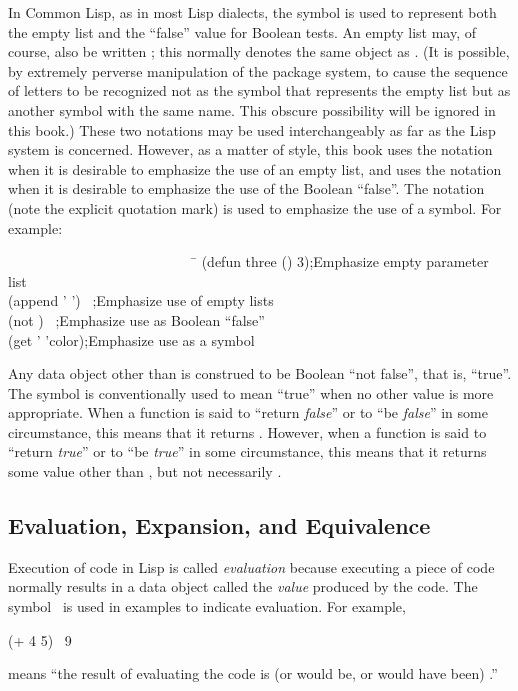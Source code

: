 In Common Lisp, as in most Lisp dialects, the symbol 
is used to represent both the empty list and the ``false'' value
for Boolean tests.  An empty list may, of course, also be written
\cd{()}; this normally denotes the same object as .
(It is possible, by extremely perverse manipulation of the package system,
to cause the sequence of letters  to be recognized
not as the symbol that represents the empty list but as another
symbol with the same name.  This obscure possibility will be ignored
in this book.)
These two notations may be used interchangeably as far as the Lisp
system is concerned.  However, as a matter of style,
this book
uses the notation {\empty} when it is desirable to emphasize
the use of an empty list, and uses the notation {\false}
when it is desirable to emphasize the use of the Boolean ``false''.
The notation  (note the explicit quotation mark) is used to emphasize
the use of a symbol.
For example:
\begin{lisp}
~~~~~~~~~~~~~~~~~~~~~~~~~~~\=\kill
(defun three () 3)\>;{\rm Emphasize empty parameter list} \\
(append '{\empty} '{\empty}) \EV\ {\empty}\>;{\rm Emphasize use of empty lists} \\
(not {\false}) \EV\ {\true}\>;{\rm Emphasize use as Boolean ``false''} \\
(get '{\nil} 'color)\>;{\rm Emphasize use as a symbol}
\end{lisp}

Any data object other than {\false} is construed to be Boolean
``not false'', that is, ``true''.  The symbol {\true} is conventionally
used to mean ``true'' when no other value is more appropriate.
When a function is said to ``return {\it false}'' or to ``be {\it false}''
in some circumstance, this means that it returns {\false}.
However, when a function is said to ``return {\it true}'' or to ``be {\it true}''
in some circumstance, this means that it returns some value other
than {\false}, but not necessarily {\true}.

\subsection{Evaluation, Expansion, and Equivalence}

Execution of code in Lisp is called {\it evaluation} because executing a
piece of code normally results in a data object called the {\it value}
produced by the code.  The symbol \EV\ is used in examples to
indicate evaluation.
For example,
\begin{lisp}
(+ 4 5) \EV\ 9
\end{lisp}
means ``the result of evaluating the code  is (or would be,
or would have been) .'' 

